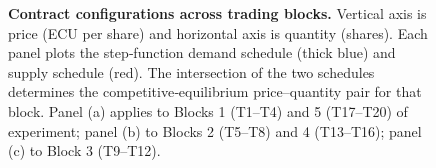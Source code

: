 \begin{figure}
\begin{subfigure}[c]{0.33\linewidth}
    \end{subfigure}
    \caption{\textbf{Contract configurations across trading blocks.}  \footnotesize
Vertical axis is price (ECU per share) and horizontal axis is quantity (shares). Each panel plots the step‐function demand schedule (thick blue) and supply schedule (red).  
The intersection of the two schedules determines the competitive‐equilibrium price–quantity pair for that block.  
Panel (a) applies to Blocks 1 (T1–T4) and 5 (T17–T20) of experiment; panel (b) to Blocks 2 (T5–T8) and 4 (T13–T16); panel (c) to Block 3 (T9–T12). }
    \label{fig:3contract_configs_new}
\end{figure}
